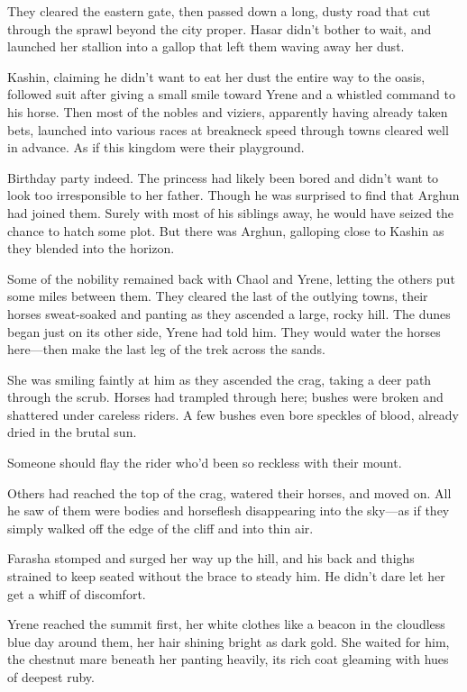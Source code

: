 They cleared the eastern gate, then passed down a long, dusty road that cut through the sprawl beyond the city proper. Hasar didn't bother to wait, and launched her stallion into a gallop that left them waving away her dust.

Kashin, claiming he didn't want to eat her dust the entire way to the oasis, followed suit after giving a small smile toward Yrene and a whistled command to his horse. Then most of the nobles and viziers, apparently having already taken bets, launched into various races at breakneck speed through towns cleared well in advance. As if this kingdom were their playground.

Birthday party indeed. The princess had likely been bored and didn't want to look too irresponsible to her father. Though he was surprised to find that Arghun had joined them. Surely with most of his siblings away, he would have seized the chance to hatch some plot. But there was Arghun, galloping close to Kashin as they blended into the horizon.

Some of the nobility remained back with Chaol and Yrene, letting the others put some miles between them. They cleared the last of the outlying towns, their horses sweat-soaked and panting as they ascended a large, rocky hill. The dunes began just on its other side, Yrene had told him. They would water the horses here---then make the last leg of the trek across the sands.

She was smiling faintly at him as they ascended the crag, taking a deer path through the scrub. Horses had trampled through here; bushes were broken and shattered under careless riders. A few bushes even bore speckles of blood, already dried in the brutal sun.

Someone should flay the rider who'd been so reckless with their mount.

Others had reached the top of the crag, watered their horses, and moved on. All he saw of them were bodies and horseflesh disappearing into the sky---as if they simply walked off the edge of the cliff and into thin air.

Farasha stomped and surged her way up the hill, and his back and thighs strained to keep seated without the brace to steady him. He didn't dare let her get a whiff of discomfort.

Yrene reached the summit first, her white clothes like a beacon in the cloudless blue day around them, her hair shining bright as dark gold. She waited for him, the chestnut mare beneath her panting heavily, its rich coat gleaming with hues of deepest ruby.

